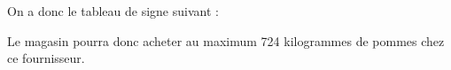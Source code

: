 \documentclass[a4paper,11pt,exos]{nsi} %
\begin{document}
\begin{enumerate}
    On a donc le tableau de signe suivant :
    \begin{center}
    \end{center}
    Le magasin pourra donc acheter au maximum 724 kilogrammes de pommes chez ce fournisseur.
\end{enumerate}
\end{document}
